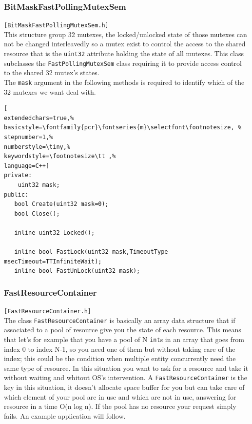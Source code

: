 \subsubsection{BitMaskFastPollingMutexSem}
\texttt{[BitMaskFastPollingMutexSem.h]}\\
This structure group 32 mutexes, the locked/unlocked state of those mutexes can not be changed interleavedly so a mutex exist to control the access to the shared resource that is the \texttt{uint32} attribute holding the state of all mutexes. This class subclasses the \texttt{FastPollingMutexSem} class requiring it to provide access control to the shared 32 mutex's states.\\


The \texttt{mask} argument in the following methods is required to identify which of the 32 mutexes we want deal with.

\begin{lstlisting}[
extendedchars=true,%
basicstyle=\fontfamily{pcr}\fontseries{m}\selectfont\footnotesize, %
stepnumber=1,%
numberstyle=\tiny,%
keywordstyle=\footnotesize\tt ,%
language=C++]
private:
    uint32 mask;
public:
   bool Create(uint32 mask=0);
   bool Close();

   inline uint32 Locked();

   inline bool FastLock(uint32 mask,TimeoutType msecTimeout=TTInfiniteWait);
   inline bool FastUnLock(uint32 mask);
\end{lstlisting}



\subsubsection{FastResourceContainer}
\texttt{[FastResourceContainer.h]}\\
The class \texttt{FastResourceContainer} is basically an array data structure that if associated to a pool of resource give you the state of each resource. This means that let's for example that you have a pool of N \texttt{int}s in an array that goes from index 0 to index N-1, so you need one of them but without taking care of the index; this could be the condition when multiple entity concurrently need the same type of resource. In this situation you want to ask for a resource and take it without waiting and whitout OS's intervention.
A \texttt{FastResourceContainer} is the key in this situation, it doesn't allocate space buffer for you but can take care of which element of your pool are in use and which are not in use, answering for resource in a time O(n log n). If the pool has no resource your request simply fails. An example application will follow. \\


